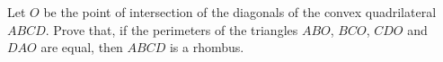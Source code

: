 Let $O$ be the point of intersection of the diagonals of the convex quadrilateral $ABCD$. Prove that, if the perimeters of the triangles $ABO$, $BCO$, $CDO$ and $DAO$ are equal, then $ABCD$ is a rhombus.
